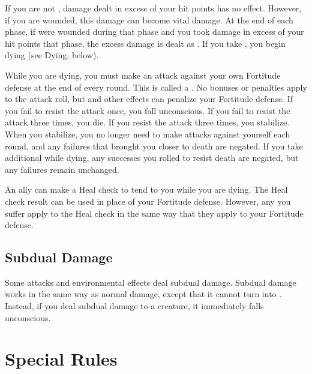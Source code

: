         \label{Vital Damage}
        If you are not , damage dealt in excess of your hit points has no effect.
        However, if you are wounded, this damage can become vital damage.
        At the end of each phase, if were wounded during that phase and you took damage in excess of your hit points that phase, the excess damage is dealt as .
        If you take , you begin dying (see Dying, below).

        \label{Dying} While you are dying, you must make an attack against your own Fortitude defense at the end of every round.
        This is called a .
        No bonuses or penalties apply to the attack roll, but  and other effects can penalize your Fortitude defense.
        If you fail to resist the attack once, you fall unconscious.
        If you fail to resist the attack three times, you die.
        If you resist the attack three times, you stabilize.
        When you stabilize, you no longer need to make attacks against yourself each round, and any failures that brought you closer to death are negated.
        If you take additional  while dying, any successes you rolled to resist death are negated, but any failures remain unchanged.

        An ally can make a Heal check to tend to you while you are dying.
        The Heal check result can be used in place of your Fortitude defense.
        However, any  you suffer apply to the Heal check in the same way that they apply to your Fortitude defense.

    \subsection{Subdual Damage}\label{Subdual Damage}
        Some attacks and environmental effects deal subdual damage.
        Subdual damage works in the same way as normal damage, except that it cannot turn into .
        Instead, if you deal subdual damage to a  creature, it immediately falls unconscious.


\section{Special Rules}

